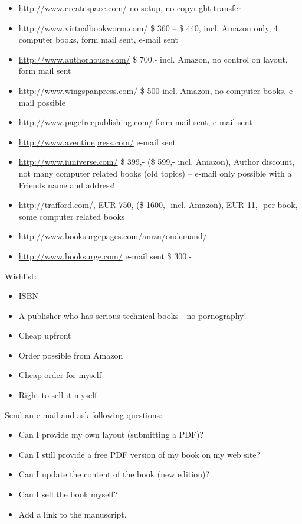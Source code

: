 \begin{itemize}
    \item \url{http://www.createspace.com/} no setup, no
        copyright transfer
    \item \url{http://www.virtualbookworm.com/} \$ 360 -- \$ 440, incl. Amazon only, 4 computer
    books, form mail sent, e-mail sent
    \item \url{http://www.authorhouse.com/} \$ 700.- incl. Amazon,
    no control on layout, form mail sent
    \item \url{http://www.wingspanpress.com/} \$ 500 incl. Amazon,
    no computer books, e-mail possible
    \item \url{http://www.pagefreepublishing.com/} form mail sent,
    e-mail sent
    \item \url{http://www.aventinepress.com/} e-mail sent
    \item \url{http://www.iuniverse.com/} \$ 399,- (\$ 599,- incl.
    Amazon), Author discount, not many computer related books (old
    topics) -- e-mail only possible with a Friends name and address!
    \item \url{http://trafford.com/}, EUR 750,-(\$ 1600,- incl. Amazon), EUR 11,- per
    book, some computer related books
    \item \url{http://www.booksurgepages.com/amzn/ondemand/}
    \item \url{http://www.booksurge.com/} e-mail sent \$ 300.-
\end{itemize}

Wishlist:
\begin{itemize}
    \item ISBN
    \item A publisher who has serious technical books - no pornography!
    \item Cheap upfront
    \item Order possible from Amazon
    \item Cheap order for myself
    \item Right to sell it myself
\end{itemize}

Send an e-mail and ask following questions:
\begin{itemize}
    \item Can I provide my own layout (submitting a PDF)?
    \item Can I still provide a free PDF version of my book on my
    web site?
    \item Can I update the content of the book (new edition)?
    \item Can I sell the book myself?
    \item Add a link to the manuscript.
\end{itemize}

